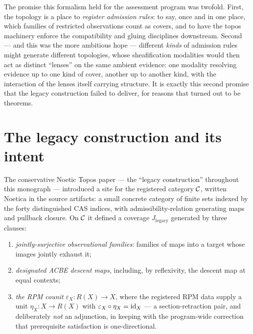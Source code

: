 The promise this formalism held for the assessment program was twofold.
First, the topology is a place to \emph{register admission rules}: to say,
once and in one place, which families of restricted observations count as
covers, and to have the topos machinery enforce the compatibility and gluing
disciplines downstream. Second --- and this was the more ambitious hope ---
different \emph{kinds} of admission rules might generate different
topologies, whose sheafification modalities would then act as distinct
``lenses'' on the same ambient evidence: one modality resolving evidence up
to one kind of cover, another up to another kind, with the interaction of
the lenses itself carrying structure. It is exactly this second promise that
the legacy construction failed to deliver, for reasons that turned out to be
theorems.

\section{The legacy construction and its intent}\label{ch01:sec:legacy}

The conservative Noetic Topos paper --- the ``legacy construction''
throughout this monograph --- introduced a site for the registered category
$\mathcal{C}$, written $\mathrm{Noetica}$ in the source artifacts: a small concrete
category of finite sets indexed by the forty distinguished CAS indices, with
admissibility-relation generating maps and pullback closure. On $\mathcal{C}$ it
defined a coverage $J_{\mathrm{legacy}}$ generated by three clauses:

\begin{enumerate}
\item[(O)] \emph{jointly-surjective observational families}: families of
maps into a target whose images jointly exhaust it;
\item[(A)] \emph{designated ACBE descent maps}, including, by reflexivity,
the descent map at equal contexts;
\item[(R)] \emph{the RPM counit} $\varepsilon_X : R(X) \to X$, where the
registered RPM data supply a unit $\eta_X : X \to R(X)$ with
$\varepsilon_X \circ \eta_X = \mathrm{id}_X$ --- a section-retraction pair, and
deliberately \emph{not} an adjunction, in keeping with the program-wide
correction that prerequisite satisfaction is one-directional.
\end{enumerate}

